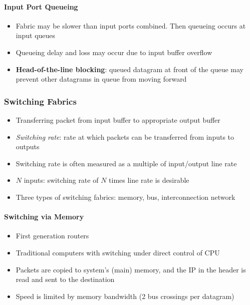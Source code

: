 \paragraph{Input Port Queueing}
\begin{itemize}
	\item Fabric may be slower than input ports combined. Then queueing occurs at input queues
	\item Queueing delay and loss may occur due to input buffer overflow
	\item \textbf{Head-of-the-line blocking}: queued datagram at front of the queue may prevent other datagrams in queue from moving forward
\end{itemize}

\subsubsection{Switching Fabrics}
\begin{itemize}
	\item Transferring packet from input buffer to appropriate output buffer
	\item \textit{Switching rate}: rate at which packets can be transferred from inputs to outputs
	\item Switching rate is often measured as a multiple of input/output line rate
	\item $N$ inputs: switching rate of $N$ times line rate is desirable
	\item Three types of switching fabrics: memory, bus, interconnection network
\end{itemize}

\paragraph{Switching via Memory}
\begin{itemize}
	\item First generation routers
	\item Traditional computers with switching under direct control of CPU
	\item Packets are copied to system's (main) memory, and the IP in the header is read and sent to the destination
	\item Speed is limited by memory bandwidth (2 bus crossings per datagram)
\end{itemize}

